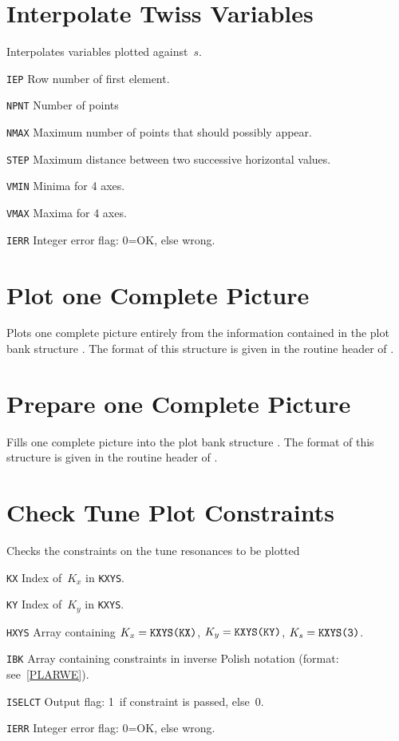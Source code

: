 \section{Interpolate Twiss Variables}
\label{PLINTP}
Interpolates variables plotted against~$s$.   
\begin{mylist}
\item[\tt IEP]
Row number of first element.
\item[\tt NPNT]
Number of points 
\item[\tt NMAX]
Maximum number of points that should possibly appear.
\item[\tt STEP]
Maximum distance between two successive horizontal values.
\item[\tt VMIN]
Minima for 4 axes.
\item[\tt VMAX]
Maxima for 4 axes.
\item[\tt IERR]
Integer error flag: 0=OK, else wrong.
\end{mylist}

\section{Plot one Complete Picture}
\label{PLPLOT}
Plots one complete picture entirely from the information contained
in the plot bank structure .
The format of this structure is given in the routine header of
.

\section{Prepare one Complete Picture}
\label{PLPREP}
Fills one complete picture 
into the plot bank structure .
The format of this structure is given in the routine header of
.

\section{Check Tune Plot Constraints}
\label{PLQCON}
Checks the constraints on the tune resonances to be plotted
\begin{mylist}
\item[\tt KX]
Index of~$K_x$ in {\tt KXYS}.
\item[\tt KY]
Index of~$K_y$ in {\tt KXYS}.
\item[\tt HXYS]
Array containing $K_x=\hbox{\tt KXYS(KX)}$, $K_y=\hbox{\tt KXYS(KY)}$,
$K_s = \hbox{\tt KXYS(3)}$.
\item[\tt IBK]
Array containing constraints in inverse Polish notation 
(format: see~\ref{PLARWE}).
\item[\tt ISELCT]
Output flag: 1~if constraint is passed, else~0.
\item[\tt IERR]
Integer error flag: 0=OK, else wrong.
\end{mylist}

